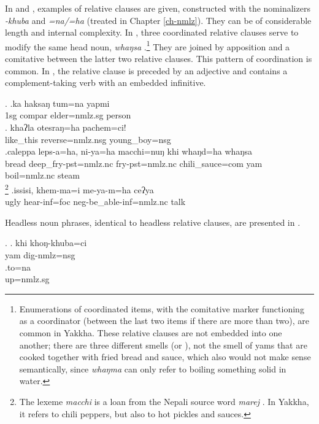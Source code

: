  In \Next and \NNext, examples of relative clauses are given, constructed with the nominalizers \emph{-khuba} and \emph{=na/=ha} (treated in Chapter \ref{ch-nmlz}). They can be of considerable length and internal complexity. 
 In \Next[c], three coordinated relative clauses  serve to modify the same head noun, \emph{whaŋsa} .\footnote{Enumerations of coordinated items, with the comitative marker functioning as a coordinator (between the last two items if there are more than two), are common in Yakkha. These relative clauses are not embedded into one  another; there are three different smells (or ), not the smell of yams that are cooked together with fried bread and sauce, which also would not make sense semantically, since \emph{whaŋma} can only refer to boiling something solid in water.} They are joined by apposition and a comitative between the latter two relative clauses. This pattern of coordination is common. In \Next[d], the relative clause is preceded by an adjective and contains a complement-taking verb with an embedded infinitive.
 
 \ex. \ag.ka  haksaŋ tum=na  yapmi\\
 {\sc 1sg} {\sc compar} elder{\sc =nmlz.sg} person\\
  
 \bg. khaʔla   otesraŋ=ha   pachem=ci!\\
 like\_this reverse{\sc =nmlz.nsg} young\_boy{\sc =nsg}\\
  
 \bg.caleppa leps-a=ha,     ni-ya=ha macchi=nuŋ    khi whaŋd=ha     whaŋsa\\
 bread deep\_fry{\sc [3sg]-pst=nmlz.nc} fry{\sc [3sg]-pst=nmlz.nc} chili\_sauce{\sc =com} yam boil{\sc [3sg;pst]=nmlz.nc} steam\\
 \footnote{The lexeme \emph{macchi} is a loan from the Nepali source word \emph{marej} . In Yakkha, it refers to chili peppers, but also to hot pickles and sauces.} 
\bg.issisi, khem-ma=i          me-ya-m=ha                         ceʔya\\
ugly hear{\sc -inf=foc} {\sc neg-}be\_able{\sc -inf=nmlz.nc} talk\\
  

Headless noun phrases, identical to headless relative clauses, are presented in \Next. 

\ex. \ag.  khi khoŋ-khuba=ci\\
yam dig{\sc -nmlz=nsg}\\
 
\bg.to=na\\
up{\sc =nmlz.sg}\\


